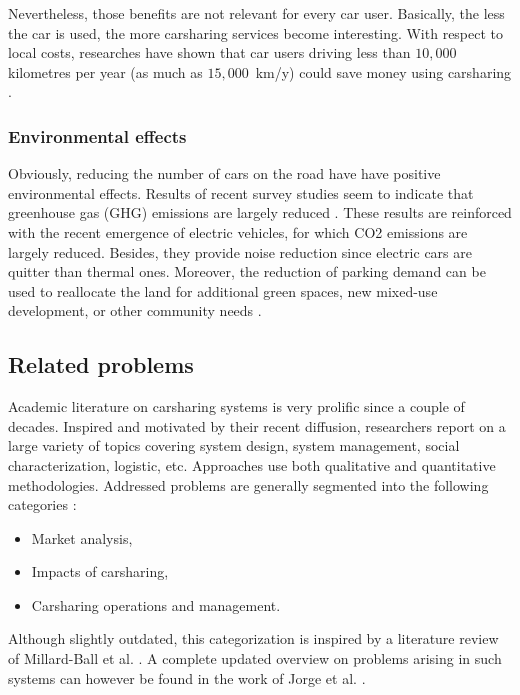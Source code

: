\begin{bibunit}[ieeetr]
\medskip
Nevertheless, those benefits are not relevant for every car user.
Basically, the less the car is used, the more carsharing services become interesting.
With respect to local costs, researches have shown that car users driving less than $10,000$ kilometres per year (as much as \hbox{$15,000$ km/y}) could save money using carsharing \cite{litman_evaluating_2000, prettenthaler_ownership_1999}.



\subsubsection{Environmental effects}

Obviously, reducing the number of cars on the road have have positive environmental effects.
Results of recent survey studies seem to indicate that greenhouse gas (GHG) emissions are largely reduced 
\cite{martin_greenhouse_2011, firnkorn_what_2011}.
These results are reinforced with the recent emergence of electric vehicles, for which CO2 emissions are largely reduced.
Besides, they provide noise reduction since electric cars are quitter than thermal ones.
Moreover, the reduction of parking demand can be used to reallocate the land for additional green spaces, new mixed-use development, or other community needs \cite{cohen_carsharing_2008}.


\subsection{Related problems}

Academic literature on carsharing systems is very prolific since a couple of decades.
Inspired and motivated by their recent diffusion, researchers report on a large variety of topics covering system design, system management, social characterization, logistic, etc.
Approaches use both qualitative and quantitative methodologies.
Addressed problems are generally segmented into the following categories \cite{ciari_sharing_2012}:
\begin{itemize}
\item Market analysis,
\item Impacts of carsharing,
\item Carsharing operations and management.
\end{itemize}

Although slightly outdated, this categorization is inspired by a literature review of Millard-Ball et al. \cite{millard_ball_car_sharing_2005}.
A complete updated overview on problems arising in such systems can however be found in the work of Jorge et al. \cite{jorge_carsharing_2013}.


\end{bibunit}
